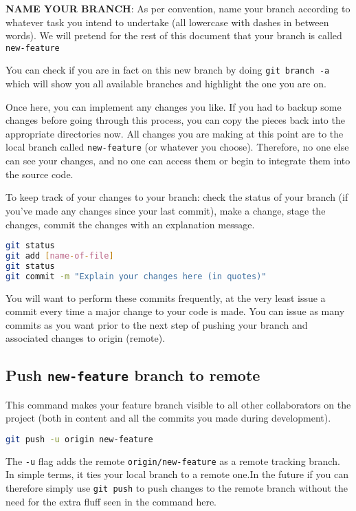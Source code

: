 \documentclass[10pt]{article}
\begin{document}
\textbf{NAME YOUR BRANCH}: As per convention, name your branch according to whatever task you intend to undertake (all lowercase with dashes in between words). We will pretend for the rest of this document that your branch is called \texttt{new-feature}

You can check if you are in fact on this new branch by doing \texttt{git branch -a} which will show you all available branches and highlight the one you are on.

Once here, you can implement any changes you like. If you had to backup some changes before going through this process, you can copy the pieces back into the appropriate directories now. All changes you are making at this point are to the local branch called \texttt{new-feature} (or whatever you choose). Therefore, no one else can see your changes, and no one can access them or begin to integrate them into the source code.

To keep track of your changes to your branch: check the status of your branch (if you've made any changes since your last commit), make a change, stage the changes, commit the changes with an explanation message.

\begin{lstlisting}[language=bash]
git status
git add [name-of-file]
git status
git commit -m "Explain your changes here (in quotes)"
\end{lstlisting}

You will want to perform these commits frequently, at the very least issue a commit every time a major change to your code is made. You can issue as many commits as you want prior to the next step of pushing your branch and associated changes to origin (remote).

\subsection{Push \texttt{new-feature} branch to remote}
This command makes your feature branch visible to all other collaborators on the project (both in content and all the commits you made during development).

\begin{lstlisting}[language=bash]
git push -u origin new-feature
\end{lstlisting}

 The \texttt{-u} flag adds the remote \texttt{origin/new-feature} as a remote tracking branch. In simple terms, it ties your local branch to a remote one.In the future if you can therefore simply use \texttt{git push} to push changes to the remote branch without the need for the extra fluff seen in the command here.
\end{document}

